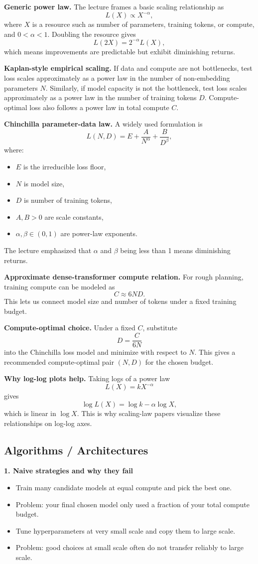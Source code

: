 \documentclass[11pt]{article}
\begin{document}
\textbf{Generic power law.} The lecture frames a basic scaling relationship as
\[
L(X) \propto X^{-\alpha},
\]
where \(X\) is a resource such as number of parameters, training tokens, or compute, and \(0 < \alpha < 1\). Doubling the resource gives
\[
L(2X) = 2^{-\alpha}L(X),
\]
which means improvements are predictable but exhibit diminishing returns.

\textbf{Kaplan-style empirical scaling.} If data and compute are not bottlenecks, test loss scales approximately as a power law in the number of non-embedding parameters \(N\). Similarly, if model capacity is not the bottleneck, test loss scales approximately as a power law in the number of training tokens \(D\). Compute-optimal loss also follows a power law in total compute \(C\).

\textbf{Chinchilla parameter-data law.} A widely used formulation is
\[
L(N, D) = E + \frac{A}{N^{\alpha}} + \frac{B}{D^{\beta}},
\]
where:
\begin{itemize}
    \item \(E\) is the irreducible loss floor,
    \item \(N\) is model size,
    \item \(D\) is number of training tokens,
    \item \(A,B > 0\) are scale constants,
    \item \(\alpha,\beta \in (0,1)\) are power-law exponents.
\end{itemize}
The lecture emphasized that \(\alpha\) and \(\beta\) being less than 1 means diminishing returns.

\textbf{Approximate dense-transformer compute relation.} For rough planning, training compute can be modeled as
\[
C \approx 6 N D.
\]
This lets us connect model size and number of tokens under a fixed training budget.

\textbf{Compute-optimal choice.} Under a fixed \(C\), substitute
\[
D = \frac{C}{6N}
\]
into the Chinchilla loss model and minimize with respect to \(N\). This gives a recommended compute-optimal pair \((N,D)\) for the chosen budget.

\textbf{Why log-log plots help.} Taking logs of a power law
\[
L(X) = kX^{-\alpha}
\]
gives
\[
\log L(X) = \log k - \alpha \log X,
\]
which is linear in \(\log X\). This is why scaling-law papers visualize these relationships on log-log axes.

\subsection{Algorithms / Architectures}
\textbf{1. Naive strategies and why they fail}
\begin{itemize}
    \item Train many candidate models at equal compute and pick the best one.
    \item Problem: your final chosen model only used a fraction of your total compute budget.
    \item Tune hyperparameters at very small scale and copy them to large scale.
    \item Problem: good choices at small scale often do not transfer reliably to large scale.
\end{itemize}
\end{document}
